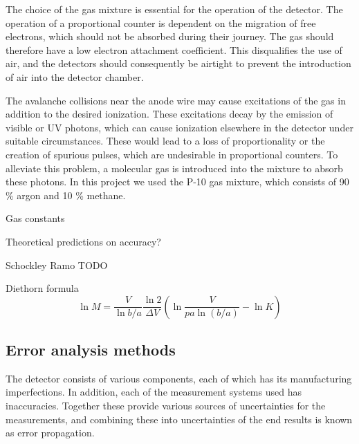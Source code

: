 \documentclass[a4paper]{article}
\begin{document}
The choice of the gas mixture is essential for the operation of the detector.
The operation of a proportional counter is dependent on the migration of free electrons, which should not be absorbed during their journey.
The gas should therefore have a low electron attachment coefficient.
This disqualifies the use of air, and the detectors should consequently be airtight to prevent the introduction of air into the detector chamber.
\cite[p. 167--168]{knoll_radiation_2010}

The avalanche collisions near the anode wire may cause excitations of the gas in addition to the desired ionization.
These excitations decay by the emission of visible or UV photons, which can cause ionization elsewhere in the detector under suitable circumstances.
These would lead to a loss of proportionality or the creation of spurious pulses, which are undesirable in proportional counters.
To alleviate this problem, a molecular gas is introduced into the mixture to absorb these photons.
In this project we used the P-10 gas mixture, which consists of 90 \% argon and 10 \% methane.
\cite[p. 168]{knoll_radiation_2010}


Gas constants \cite{wolff_measurement_1974}

Theoretical predictions on accuracy?

Schockley \cite{shockley_currents_1938}
Ramo \cite{ramo_currents_1939}
TODO

Diethorn formula \cite[eq. 6.10]{knoll_radiation_2010}
\begin{equation}
\ln M = \frac{V}{\ln b/a} \frac{\ln 2}{\Delta V}
\left( \ln \frac{V}{pa \ln (b/a)} - \ln K \right)
\end{equation}


\subsection{Error analysis methods}
\label{error_analysis}
The detector consists of various components, each of which has its manufacturing imperfections.
In addition, each of the measurement systems used has inaccuracies.
Together these provide various sources of uncertainties for the measurements, and combining these into uncertainties of the end results is known as error propagation.
\end{document}
